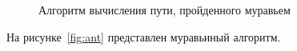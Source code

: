 \begin{figure}[h!]
	\caption{Алгоритм вычисления пути, пройденного муравьем}
	\label{fig:calcLen}
\end{figure}

На рисунке~\ref{fig:ant} представлен муравьиный алгоритм.

